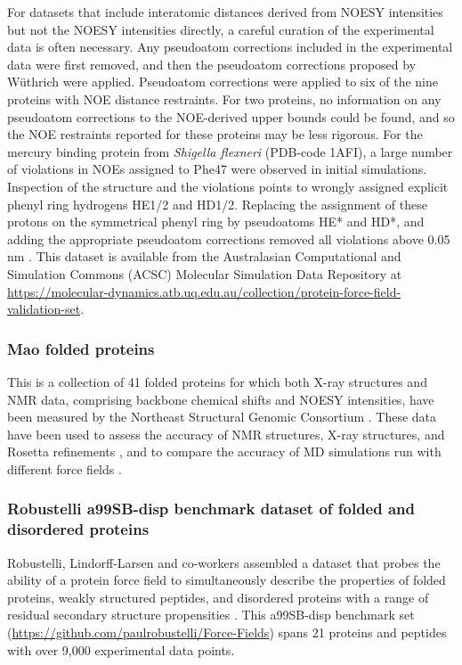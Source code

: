\documentclass[9pt,review]{livecoms}
\begin{document}
For datasets that include interatomic distances derived from NOESY intensities but not the NOESY intensities directly, a careful curation of the experimental data is often necessary.
Any pseudoatom corrections included in the experimental data were first removed, and then the pseudoatom corrections proposed by W\"{u}thrich \cite{wuthrich_nmr_1986} were applied.
Pseudoatom corrections were applied to six of the nine proteins with NOE distance restraints.
For two proteins, no information on any pseudoatom corrections to the NOE-derived upper bounds could be found, and so the NOE restraints reported for these proteins may be less rigorous.
For the mercury binding protein from \textit{Shigella flexneri} (PDB-code 1AFI), a large number of violations in NOEs assigned to Phe47 were observed in initial simulations.
Inspection of the structure and the violations points to wrongly assigned explicit phenyl ring hydrogens HE1/2 and HD1/2.
Replacing the assignment of these protons on the symmetrical phenyl ring by pseudoatoms HE* and HD*, and adding the appropriate pseudoatom corrections \cite{wuthrich_nmr_1986} removed all violations above 0.05 nm \cite{setz_molecular_2018}.
This dataset is available from the Australasian Computational and Simulation Commons (ACSC) Molecular Simulation Data Repository \cite{mark_australasian_2022} at \url{https://molecular-dynamics.atb.uq.edu.au/collection/protein-force-field-validation-set}.

\subsubsection{Mao folded proteins}
\label{sub2:mao}

This is a collection of 41 folded proteins for which both X-ray structures and NMR data, comprising backbone chemical shifts and NOESY intensities, have been measured by the Northeast Structural Genomic Consortium \cite{mao_protein_2014}.
These data have been used to assess the accuracy of NMR structures, X-ray structures, and Rosetta refinements \cite{mao_protein_2014}, and to compare the accuracy of MD simulations run with different force fields \cite{robustelli_developing_2018,piana_development_2020}.

\subsubsection{Robustelli a99SB-disp benchmark dataset of folded and disordered proteins}
\label{sub2:robustelli}

Robustelli, Lindorff-Larsen and co-workers assembled a dataset that probes the ability of a protein force field to simultaneously describe the properties of folded proteins, weakly structured peptides, and disordered proteins with a range of residual secondary structure propensities \cite{lindorff-larsen_improved_2010,lindorff2012systematic,piana_water_2015,robustelli_developing_2018,piana_development_2020}.
This a99SB-disp benchmark set (\url{https://github.com/paulrobustelli/Force-Fields}) spans 21 proteins and peptides with over 9,000 experimental data points.
\end{document}
